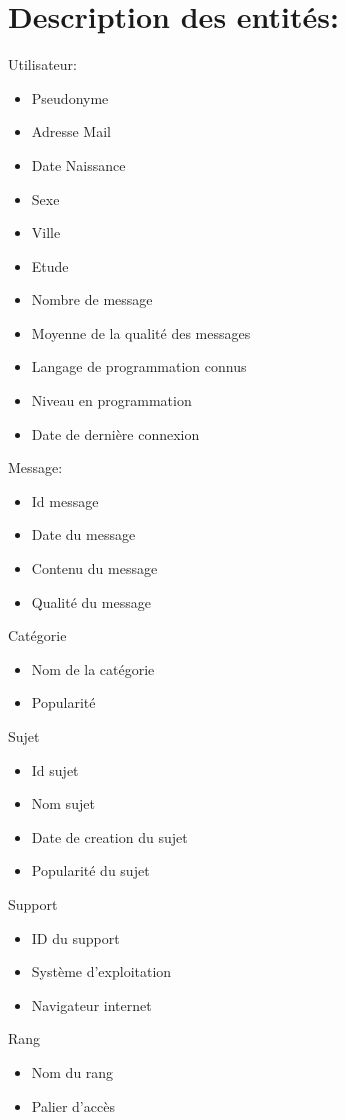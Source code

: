 \documentclass{report}
\begin{document}
\section{Description des entités:}
Utilisateur:
\begin{itemize}
		\item Pseudonyme
		\item Adresse Mail
		\item Date Naissance
		\item Sexe
		\item Ville
		\item Etude
		\item Nombre de message
		\item Moyenne de la qualité des messages
		\item Langage de programmation connus
		\item Niveau en programmation
		\item Date de dernière connexion\\
\end{itemize}
Message:
\begin{itemize}
	\item Id message
	\item Date du message
	\item Contenu du message
	\item Qualité du message\\
\end{itemize}
Catégorie
\begin{itemize}
	\item Nom de la catégorie
	\item Popularité\\
\end{itemize}
Sujet
\begin{itemize}
	\item Id sujet
   \item Nom sujet
	\item Date de creation du sujet
	\item Popularité du sujet\\
\end{itemize}
	Support
  \begin{itemize}
		\item ID du support
		\item Système d’exploitation
		\item Navigateur internet\\
  \end{itemize}
	Rang
  \begin{itemize}
		\item Nom du rang
		\item Palier d'accès\\
    \end{itemize}
\end{document}
